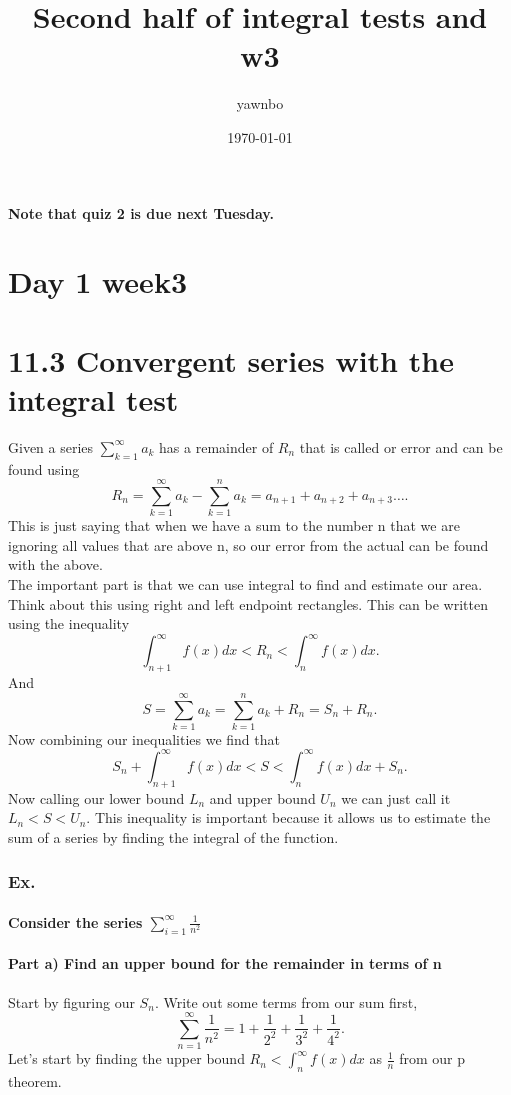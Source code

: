 \documentclass[a4paper]{article}
\title{Second half of integral tests and w3}
\author{yawnbo}
\date{\today}
\begin{document}
\maketitle
\paragraph{Note that quiz 2 is due next Tuesday. }
\section{Day 1 week3}%
\label{sec:Day 1 week3}

\section*{11.3 Convergent series with the integral test}%
\label{sec:11.3 Convergent series with the integral test}
Given a series $ \sum_{ k=1 } ^{ \infty } a_k $ has a remainder of $ R_n $ that is called or error and can be found using
\[
R_n = \sum_{ k=1 } ^{ \infty } a_k - \sum_{ k=1 } ^{ n } a_k = a_{ n+1 }+a_{ n+2 }+a_{ n+3 } \ldots
.\] 
This is just saying that when we have a sum to the number n that we are ignoring all values that are above n, so our error from the actual can be found with the above. \\

The important part is that we can use integral to find and estimate our area. Think about this using right and left endpoint rectangles. This can be written using the inequality
\[
\int_{ n+1 }^{ \infty } f\left( x \right) dx<R_n < \int_{ n }^{ \infty } f\left( x \right) dx
.\] 
And 
\[
S=\sum_{ k=1 } ^{ \infty } a_k = \sum_{ k=1 } ^{ n } a_k + R_n = S_n + R_n 
.\] 
Now combining our inequalities we find that 
\[
S_n + \int_{ n+1 }^{ \infty } f\left( x \right) dx<S < \int_{ n }^{ \infty } f\left( x \right) dx+S_n
.\] 
Now calling our lower bound $ L_n $ and upper bound $ U_n $ we can just call it $ L_n < S< U_n $. This inequality is important because it allows us to estimate the sum of a series by finding the integral of the function.


\subsubsection*{Ex. }
\paragraph{Consider the series $ \sum_{ i=1 } ^{ \infty } \frac{ 1 }{ n^2 }  $}
\paragraph{Part a) Find an upper bound for the remainder in terms of n}
Start by figuring our $ S_n $. Write out some terms from our sum first,
\[
\sum_{ n=1 } ^{ \infty } \frac{ 1 }{ n^2 } =1+\frac{ 1 }{ 2^2 } +\frac{ 1 }{ 3^2 } +\frac{ 1 }{ 4^2 } 
.\] 
Let's start by finding the upper bound $ R_n < \int_{ n }^{ \infty } f\left( x \right) dx$ as $ \frac{ 1 }{ n }  $ from our p theorem. 
\end{document}
